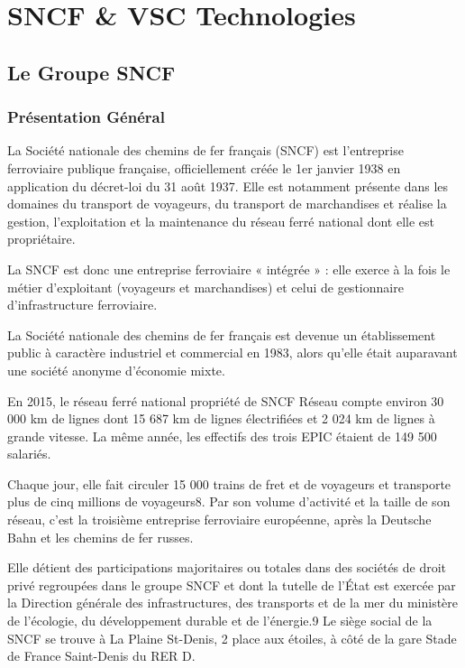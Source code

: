 \section{SNCF \& VSC Technologies}
\subsection{Le Groupe SNCF}

\subsubsection{Présentation Général}
La Société nationale des chemins de fer français (SNCF) est l'entreprise ferroviaire publique française, officiellement créée le 1er janvier 1938 en application du décret-loi du 31 août 1937.
Elle est notamment présente dans les domaines du transport de voyageurs, du transport de marchandises et réalise la gestion, l'exploitation et la maintenance du réseau ferré national dont elle est propriétaire.

La SNCF est donc une entreprise ferroviaire « intégrée » : elle exerce à la fois le métier d'exploitant (voyageurs et marchandises) et celui de gestionnaire d'infrastructure ferroviaire.

La Société nationale des chemins de fer français est devenue un établissement public à caractère industriel et commercial en 1983, alors qu'elle était auparavant une société anonyme d'économie mixte.

En 2015, le réseau ferré national propriété de SNCF Réseau compte environ 30 000 km de lignes dont 15 687 km de lignes électrifiées et 2 024 km de lignes à grande vitesse. La même année, les effectifs des trois EPIC étaient de 149 500 salariés.

Chaque jour, elle fait circuler 15 000 trains de fret et de voyageurs et transporte plus de cinq millions de voyageurs8. Par son volume d'activité et la taille de son réseau, c'est la troisième entreprise ferroviaire européenne, après la Deutsche Bahn et les chemins de fer russes.

Elle détient des participations majoritaires ou totales dans des sociétés de droit privé regroupées dans le groupe SNCF et dont la tutelle de l'État est exercée par la Direction générale des infrastructures, des transports et de la mer du ministère de l'écologie, du développement durable et de l'énergie.9 Le siège social de la SNCF se trouve à La Plaine St-Denis, 2 place aux étoiles, à côté de la gare Stade de France Saint-Denis du RER D.

